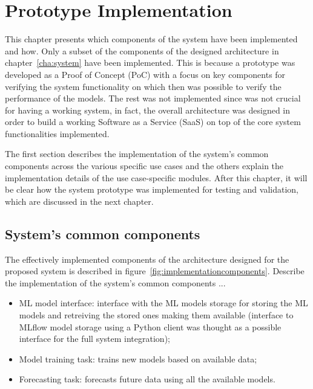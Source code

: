 \chapter{Prototype Implementation}
\label{cha:implementation}
\vspace{0.4 cm}

This chapter presents which components of the system have been implemented and how.
Only a subset of the components of the designed architecture in chapter~\ref{cha:system} have been implemented.
This is because a prototype was developed as a Proof of Concept (PoC) with a focus on key components for verifying the system functionality on which then was possible to verify the performance of the models.
The rest was not implemented since was not crucial for having a working system, in fact, the overall architecture was designed in order to build a working Software as a Service (SaaS) on top of the core system functionalities implemented.

The first section describes the implementation of the system's common components across the various specific use cases and the others explain the implementation details of the use case-specific modules.
After this chapter, it will be clear how the system prototype was implemented for testing and validation, which are discussed in the next chapter.


\section{System's common components}
\label{sec:componentsimpl}
\vspace{0.2 cm}

The effectively implemented components of the architecture designed for the proposed system is described in figure~\ref{fig:implementationcomponents}.
Describe the implementation of the system's common components ...
\begin{itemize}
  \item ML model interface: interface with the ML models storage for storing the ML models and retreiving the stored ones making them available (interface to MLflow model storage using a Python client was thought as a possible interface for the full system integration);
  \item Model training task: trains new models based on available data;
  \item Forecasting task: forecasts future data using all the available models.
\end{itemize}

